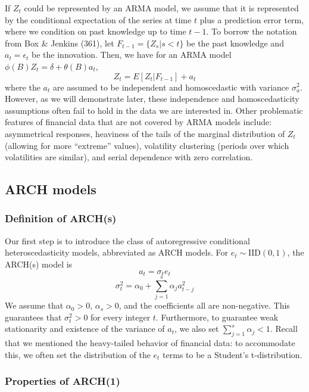 \documentclass[12pt]{article}
\begin{document}
If $Z_t$ could be represented by an ARMA model, we assume that it is represented by the conditional expectation of the series at time $t$ plus a prediction error term, where we condition on past knowledge up to time $t-1$. To borrow the notation from Box \& Jenkins (361), let $F_{t-1} = \{Z_s | s<t \}$ be the past knowledge and $a_t = \epsilon_t$ be the innovation. \cite{box} Then, we have for an ARMA model $\phi(B)Z_t = \delta + \theta(B)a_t$, $$Z_t = E[Z_t|F_{t-1}] + a_t$$ where the $a_t$ are assumed to be independent and homoscedastic with variance $\sigma^2_a$. However, as we will demonstrate later, these independence and homoscedasticity assumptions often fail to hold in the data we are interested in.  Other problematic features of financial data that are not covered by ARMA models include: asymmetrical responses, heaviness of the tails of the marginal distribution of $Z_t$ (allowing for more ``extreme'' values), volatility clustering (periods over which volatilities are similar), and serial dependence with zero correlation.

\subsection{ARCH models}
\subsubsection{Definition of ARCH(s)}

Our first step is to introduce the class of autoregressive conditional heteroscedasticity models, abbreviated as ARCH models. For $e_t \sim \text{IID}(0,1)$, the ARCH(s) model is 
\begin{equation}
    a_t = \sigma_t e_t
\end{equation}
\begin{equation}
    \sigma_t^2 = \alpha_0 + \sum_{j=1}^{s} \alpha_ja^2_{t-j}
\end{equation}
We assume that $\alpha_0 > 0$, $\alpha_s > 0$, and the coefficients all are non-negative. This guarantees that $\sigma^2_t > 0$ for every integer $t$. Furthermore, to guarantee weak stationarity and existence of the variance of $a_t$, we also set $\sum_{j=1}^{s} \alpha_j < 1$. Recall that we mentioned the heavy-tailed behavior of financial data: to accommodate this, we often set the distribution of the $e_t$ terms to be a Student's t-distribution. 

\subsubsection{Properties of ARCH(1)}
\end{document}
